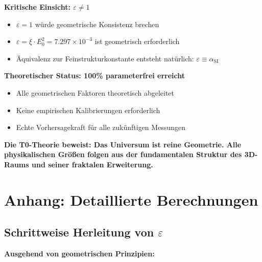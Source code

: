 \documentclass[12pt,a4paper]{article}
\numberwithin{equation}{section}
\newcommand{\xipar}{\xi}
\newcommand{\epsilonT}{\varepsilon}
\newcommand{\alphaSI}{\alpha_{\text{SI}}}
\newcommand{\Eo}{E_0}
\begin{document}
	\textbf{Kritische Einsicht: $\epsilonT \neq 1$}
	\begin{itemize}
		\item $\epsilonT = 1$ würde geometrische Konsistenz brechen
		\item $\epsilonT = \xipar \cdot \Eo^2 = 7.297 \times 10^{-3}$ ist geometrisch erforderlich
		\item Äquivalenz zur Feinstrukturkonstante entsteht natürlich: $\epsilonT \equiv \alphaSI$
	\end{itemize}
	
	\textbf{Theoretischer Status: 100\% parameterfrei erreicht}
	\begin{itemize}
		\item Alle geometrischen Faktoren theoretisch abgeleitet
		\item Keine empirischen Kalibrierungen erforderlich
		\item Echte Vorhersagekraft für alle zukünftigen Messungen
	\end{itemize}
	
	\textbf{Die T0-Theorie beweist: Das Universum ist reine Geometrie. Alle physikalischen Größen folgen aus der fundamentalen Struktur des 3D-Raums und seiner fraktalen Erweiterung.}
	
	\section{Anhang: Detaillierte Berechnungen}
	
	\subsection{Schrittweise Herleitung von $\epsilonT$}
	
	\textbf{Ausgehend von geometrischen Prinzipien:}
	
\end{document}
